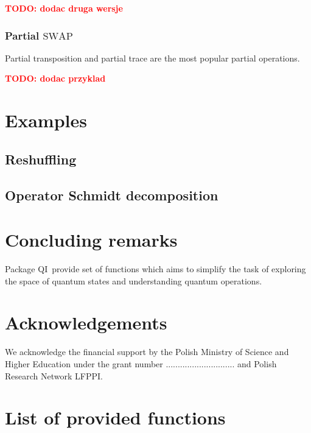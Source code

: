\documentclass{elsart}
\newcommand{\1}{{\rm 1\hspace{-0.9mm}l}}
\newcommand{\SWAP}{\ensuremath{\mathrm{SWAP}}}
\newcommand{\qi}{QI}
\newcommand{\todo}[1]{\textcolor{red}{\bf TODO: #1}}
\begin{document}
\todo{dodac druga wersje}

\subsubsection{Partial \SWAP}
Partial transposition and partial trace are the most popular partial operations.

\todo{dodac przyklad}

\section{Examples}\label{sec:examples}

\subsection{Reshuffling}


\subsection{Operator Schmidt decomposition}




\section{Concluding remarks}\label{sec:comclude}
Package \qi\ provide set of functions which aims to simplify the task of
exploring the space of quantum states and understanding quantum operations.

\section*{Acknowledgements}
We acknowledge the financial support by the Polish Ministry of Science and
Higher Education under the grant number ............................. and Polish
Research Network LFPPI. 

\appendix
\section{List of provided functions}





\end{document}

